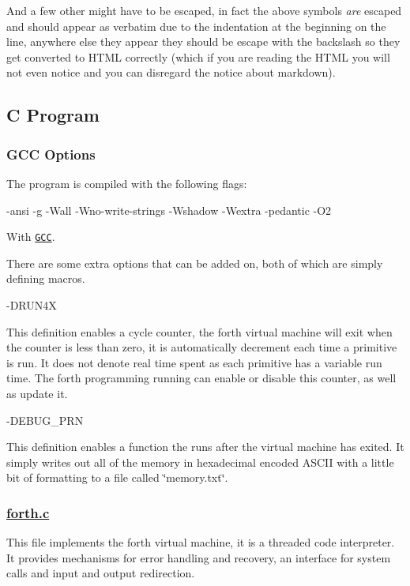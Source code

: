 And a few other might have to be escaped, in fact the above symbols {\itshape are} escaped and should appear as verbatim due to the indentation at the beginning on the line, anywhere else they appear they should be escape with the backslash so they get converted to H\-T\-M\-L correctly (which if you are reading the H\-T\-M\-L you will not even notice and you can disregard the notice about markdown).

\subsection*{C Program}

\subsubsection*{G\-C\-C Options}

The program is compiled with the following flags\-: \begin{DoxyVerb}-ansi -g -Wall -Wno-write-strings -Wshadow -Wextra -pedantic -O2
\end{DoxyVerb}


With \href{http://gcc.gnu.org/}{\tt G\-C\-C}.

There are some extra options that can be added on, both of which are simply defining macros. \begin{DoxyVerb}-DRUN4X
\end{DoxyVerb}


This definition enables a cycle counter, the forth virtual machine will exit when the counter is less than zero, it is automatically decrement each time a primitive is run. It does not denote real time spent as each primitive has a variable run time. The forth programming running can enable or disable this counter, as well as update it. \begin{DoxyVerb}-DEBUG_PRN
\end{DoxyVerb}


This definition enables a function the runs after the virtual machine has exited. It simply writes out all of the memory in hexadecimal encoded A\-S\-C\-I\-I with a little bit of formatting to a file called \char`\"{}memory.\-txt\char`\"{}.

\subsubsection*{\hyperlink{forth_8c}{forth.\-c}}

This file implements the forth virtual machine, it is a threaded code interpreter. It provides mechanisms for error handling and recovery, an interface for system calls and input and output redirection.

